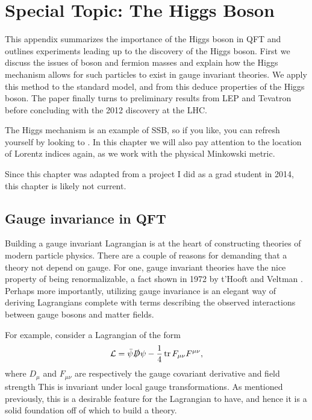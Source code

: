 \chapter{Special Topic: The Higgs Boson}\label{ap:spec_higgs}

This appendix summarizes the importance of the Higgs boson in QFT and outlines
experiments leading up to the discovery of the Higgs boson.
First we discuss the issues of boson and fermion masses and explain
how the Higgs mechanism allows for such particles to exist in gauge invariant
theories. We apply this method to the standard model, and from this deduce
properties of the Higgs boson. The paper finally turns to preliminary results 
from LEP and Tevatron before concluding with the 2012 discovery at the LHC.

The Higgs mechanism is an example of SSB, so if you like, you can refresh
yourself by looking to . In this chapter we will
also pay attention to the location of Lorentz indices again, as we
work with the physical Minkowski metric.

Since this chapter was adapted from a project I did as a grad student in 2014,
this chapter is likely not current.

\section{Gauge invariance in QFT}

Building a gauge invariant Lagrangian is at the heart of constructing theories
of modern particle physics. There are a couple of reasons for demanding that a
theory not depend on gauge. For one, gauge invariant theories have the nice
property of being renormalizable, a fact shown in 1972 by t'Hooft and Veltman 
\cite{t_hooft_regularization_1972}. Perhaps more importantly, utilizing gauge
invariance is an elegant way of deriving Lagrangians complete with terms
describing the observed interactions between gauge bosons and matter fields.

For example, consider a Lagrangian of the form
\begin{equation}
  \label{eq:genLagr}
  \mathcal{L}=\bar{\psi}\slashed{D}\psi-\frac{1}{4}\tr F_{\mu\nu}F^{\mu\nu} ,
\end{equation}
where $D_{\mu}$ and $F_{\mu\nu}$ are respectively the gauge covariant
derivative and field strength
This is invariant under local gauge transformations. 
As mentioned previously, this is a desirable feature for the
Lagrangian to have, and hence it is a solid foundation off of which to build
a theory.

